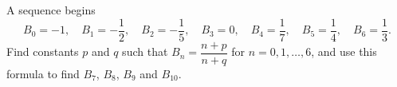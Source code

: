 A sequence begins
\[B_0=-1,\quad B_1=-\dfrac12,\quad B_2=-\dfrac15,\quad B_3=0,\quad B_4=\dfrac17,\quad B_5=\dfrac14,\quad B_6=\dfrac13.\]
Find constants $p$ and $q$ such that $B_n=\dfrac{n+p}{n+q}$ for $n=0,1,\dots,6$, and use this formula to find $B_7$, $B_8$, $B_9$ and $B_{10}$.
